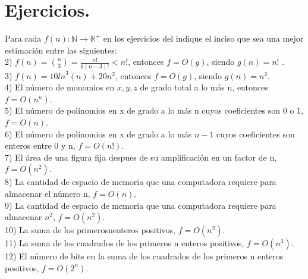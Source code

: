 \documentclass[12pt]{article}
\begin{document}
\section{Ejercicios.}

Para  cada $f(n):\mathbb{N}\rightarrow {\mathbb{R}}^{+}$  en  los  ejercicios  del indique  el  inciso  que  sea  una  mejor estimación entre las siguientes:\\

2) $f(n)=\binom{n}{3}=\frac{n!}{6(n-3)!}<n!$, entonces $f=O(g)$, siendo $g(n)=n!$ . \\

3) $f(n)=10{ln}^{3}(n)+ 20{n}^{2}$, entonces $f=O(g)$, siendo $g(n)={n}^{2}$.\\ 

4) El número de monomios en $x, y, z$ de grado total a lo más n, entonces $f=O({n}^{n})$.\\

5) El número de polinomios en x de grado a lo más n cuyos coeficientes son 0 o 1, $f=O(n)$.\\

6) El número de polinomios en x de grado a lo más $n−1$ cuyos coeficientes son enteros entre 0 y n, $f=O(n!)$. \\ 

7) El área de una figura fija despues de su amplificación en un factor de n, $f=O({n}^{2})$.\\ 

8) La cantidad de espacio de memoria que una computadora requiere para almacenar el número n, $f=O(n)$.\\

9) La cantidad de espacio de memoria que una computadora requiere para almacenar ${n}^{2}$,  $f=O({n}^{2})$.\\ 

10) La suma de los primerosnenteros positivos, $f=O({n}^{2})$.\\

11) La suma de los cuadrados de los primeros n enteros positivos, $f=O({n}^{3})$.\\

12) El número de bits en la suma de los cuadrados de los primeros n enteros positivos, $f=O({2}^{n})$.\\
\end{document}
